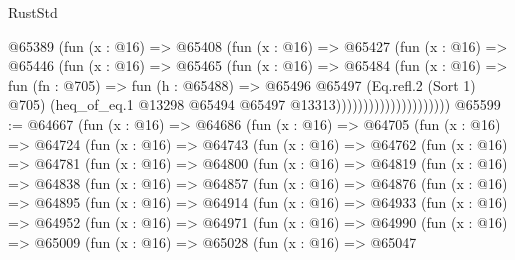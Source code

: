 \begin{lexlean}{RustStd}
\begin{coremodule}
                              @65389
                                (fun (x : @16) =>
                                @65408
                                  (fun (x : @16) =>
                                  @65427
                                    (fun (x : @16) =>
                                    @65446
                                      (fun (x : @16) =>
                                      @65465
                                        (fun (x : @16) =>
                                        @65484
                                          (fun (x : @16) =>
                                          fun (fn : @705) =>
                                          fun (h : @65488) =>
                                          @65496
                                            @65497
                                            (Eq.refl.{2} (Sort 1) @705)
                                            (heq_of_eq.{1}
                                              @13298
                                              @65494
                                              @65497
                                              @13313)))))))))))))))))))))
@65599 := @64667
    (fun (x : @16) =>
    @64686
      (fun (x : @16) =>
      @64705
        (fun (x : @16) =>
        @64724
          (fun (x : @16) =>
          @64743
            (fun (x : @16) =>
            @64762
              (fun (x : @16) =>
              @64781
                (fun (x : @16) =>
                @64800
                  (fun (x : @16) =>
                  @64819
                    (fun (x : @16) =>
                    @64838
                      (fun (x : @16) =>
                      @64857
                        (fun (x : @16) =>
                        @64876
                          (fun (x : @16) =>
                          @64895
                            (fun (x : @16) =>
                            @64914
                              (fun (x : @16) =>
                              @64933
                                (fun (x : @16) =>
                                @64952
                                  (fun (x : @16) =>
                                  @64971
                                    (fun (x : @16) =>
                                    @64990
                                      (fun (x : @16) =>
                                      @65009
                                        (fun (x : @16) =>
                                        @65028
                                          (fun (x : @16) =>
                                          @65047

\end{coremodule}
\end{lexlean}
